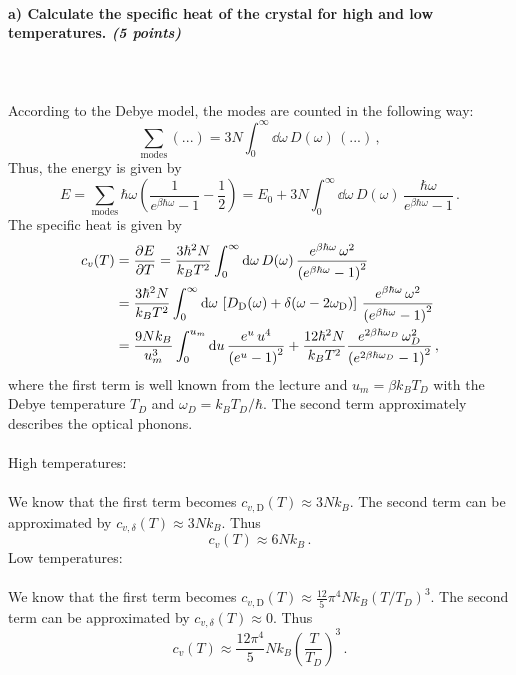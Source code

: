 \paragraph{a) Calculate the specific heat of the crystal for high and 
    low temperatures. \textit{(5 points)}
} \ \\
\\
According to the Debye model, the modes are counted in the following way:
\begin{equation}
	\sum_{\text{modes}} (...) = 3N \int_0^{\infty} \dd\omega \, D(\omega) \, (...) \,,
\end{equation}
Thus, the energy is given by
\begin{equation}
	E = \sum_{\text{modes}} \hbar \omega \left( \frac{1}{e^{\beta\hbar\omega}-1} - \frac{1}{2} \right) 
	  = E_0 + 3N \int_0^{\infty} \dd\omega \, D(\omega) \, \frac{\hbar\omega}{e^{\beta\hbar\omega}-1} \,.
\end{equation}
The specific heat is given by
\begin{align}
	c_v(T) &= \frac{\partial E}{\partial T}
			= \frac{3\hbar^2N}{k_B T^2} \int_0^{\infty} \mathrm{d}\omega \, D(\omega) \, 
			  \frac{e^{\beta\hbar\omega} \, \omega^2}{\left(e^{\beta\hbar\omega}-1\right)^2} \notag \\
		   &= \frac{3\hbar^2N}{k_B T^2} \int_0^{\infty} \mathrm{d}\omega \, 
		      \left[ D_\textnormal{D}(\omega)+\delta(\omega-2\omega_\textnormal{D}) \right] \, 
			  \frac{e^{\beta\hbar\omega} \, \omega^2}{\left(e^{\beta\hbar\omega}-1\right)^2} \notag \\
		   &= \frac{9Nk_B}{u_m^3} \int_0^{u_m} \mathrm{d} u \, \frac{e^u \, u^4}{\left(e^u-1\right)^2}
			   + \frac{12\hbar^2N}{k_B T^2}  
			  \frac{e^{2\beta\hbar\omega_D} \, \omega_D^2}{\left(e^{2\beta\hbar\omega_D}-1\right)^2} \,,
\end{align}
where the first term is well known from the lecture and $u_m = \beta k_B T_D$ with the Debye 
temperature $T_D$ and $\omega_D = k_B T_D / \hbar$. The second term approximately describes the optical phonons. \\
\\
High temperatures: \\
\\
We know that the first term becomes $c_{v,\text{D}}(T) \approx 3Nk_B$. The second term can be approximated by
$c_{v,\delta}(T) \approx 3Nk_B$. Thus
\begin{equation}
	c_{v}(T) \approx 6Nk_B \,.
\end{equation}
Low temperatures: \\
\\
We know that the first term becomes $c_{v,\text{D}}(T) \approx \frac{12}{5} \pi^4Nk_B (T/T_D)^3$. 
The second term can be approximated by
$c_{v,\delta}(T) \approx 0$. Thus
\begin{equation}
	c_{v}(T) \approx \frac{12\pi^4}{5} N k_B \left( \frac{T}{T_D} \right)^3 \,.
\end{equation}